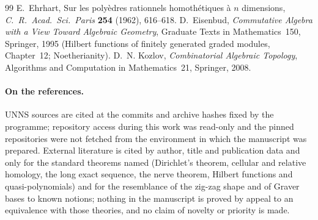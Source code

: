 \begin{thebibliography}{99}
 E.~Ehrhart, Sur les poly\`edres rationnels homoth\'etiques \`a $n$ dimensions, \emph{C.~R.\ Acad.\ Sci.\ Paris} \textbf{254} (1962), 616--618.
 D.~Eisenbud, \emph{Commutative Algebra with a View Toward Algebraic Geometry}, Graduate Texts in Mathematics~150, Springer, 1995 (Hilbert functions of finitely generated graded modules, Chapter~12; Noetherianity).
 D.~N. Kozlov, \emph{Combinatorial Algebraic Topology}, Algorithms and Computation in Mathematics~21, Springer, 2008.
\end{thebibliography}
\paragraph{On the references.} UNNS sources are cited at the commits and archive hashes fixed by the programme; repository access during this work was read-only and the pinned repositories were not fetched from the environment in which the manuscript was prepared. External literature is cited by author, title and publication data and only for the standard theorems named (Dirichlet's theorem, cellular and relative homology, the long exact sequence, the nerve theorem, Hilbert functions and quasi-polynomials) and for the resemblance of the zig-zag shape and of Graver bases to known notions; nothing in the manuscript is proved by appeal to an equivalence with those theories, and no claim of novelty or priority is made.
